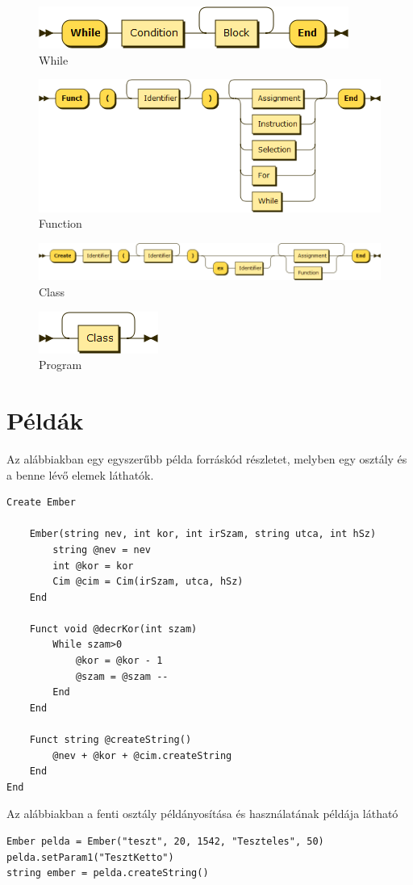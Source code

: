 \begin{figure}[h!]
\centering
\includegraphics[scale=0.4]{kepek/rr_while.png}
\caption{While}
\label{fig:rr_while}
\end{figure}

\begin{figure}[h!]
\centering
\includegraphics[scale=0.4]{kepek/rr_function.png}
\caption{Function}
\label{fig:rr_function}
\end{figure}

\begin{figure}[h!]
\centering
\includegraphics[scale=0.4]{kepek/rr_class.png}
\caption{Class}
\label{fig:rr_class}
\end{figure}

\begin{figure}[h!]
\centering
\includegraphics[scale=1]{kepek/rr_program.png}
\caption{Program}
\label{fig:rr_program}
\end{figure}

\section{Példák}

Az alábbiakban egy egyszerűbb példa forráskód részletet, melyben egy osztály és a benne lévő elemek láthatók.

\begin{verbatim}
Create Ember
	
	Ember(string nev, int kor, int irSzam, string utca, int hSz)
		string @nev = nev
		int @kor = kor
		Cim @cim = Cim(irSzam, utca, hSz)
	End
		
	Funct void @decrKor(int szam)
		While szam>0
			@kor = @kor - 1
			@szam = @szam --
		End
	End
	
	Funct string @createString()
		@nev + @kor + @cim.createString
	End
End
\end{verbatim}
		
Az alábbiakban a fenti osztály példányosítása és használatának példája látható

\begin{verbatim}
Ember pelda = Ember("teszt", 20, 1542, "Teszteles", 50)
pelda.setParam1("TesztKetto")
string ember = pelda.createString()
\end{verbatim}
